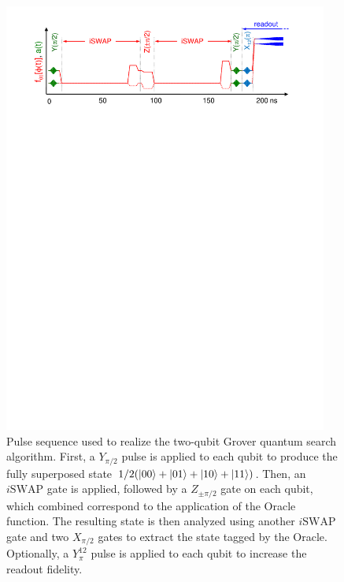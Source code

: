\begin{figure}[ht!]
	\centering
		\includegraphics[width=0.95\textwidth]{./material/papers/grover/figures/grover_algorithm_pulse_sequence}
	\caption{Pulse sequence used to realize the two-qubit Grover quantum search algorithm. First, a $Y_{\pi/2}$ pulse is applied to each qubit to produce the fully superposed state $1/2(\left| 00 \right>+\left| 01 \right>+\left| 10 \right>+\left| 11 \right>)$. Then, an $i\mathrm{SWAP}$ gate is applied, followed by a $Z_{\pm \pi /2}$ gate on each qubit, which combined correspond to the application of the Oracle function. The resulting state is then analyzed using another $i\mathrm{SWAP}$ gate and two $X_{\pi/2}$ gates to extract the state tagged by the Oracle. Optionally, a $Y^{12}_{\pi}$ pulse is applied to each qubit to increase the readout fidelity.}
	\label{fig:GroverPulseSequence}
\end{figure}

